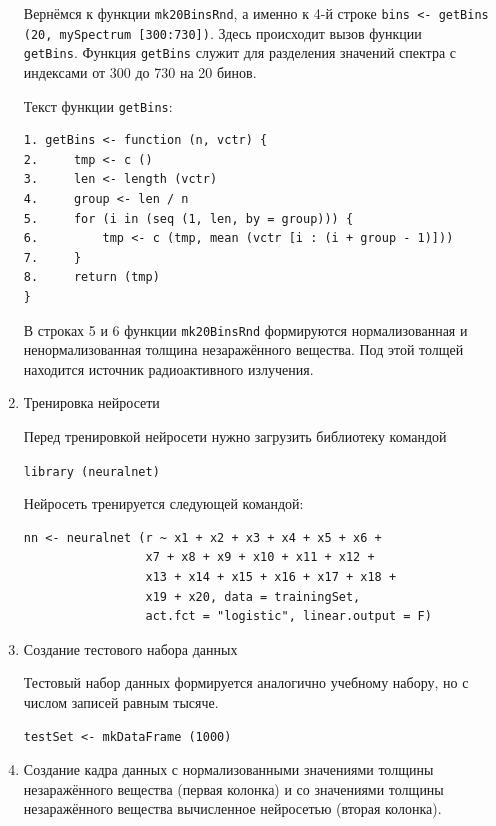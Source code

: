 \documentclass[12pt]{article}
\begin{document}
\begin{enumerate}
  Вернёмся к функции \verb|mk20BinsRnd|, а именно к 4-й строке \newline \verb|bins <- getBins (20, mySpectrum [300:730])|. Здесь происходит вызов функции \\ \verb|getBins|. Функция \verb|getBins| служит для разделения значений спектра с индексами от 300 до 730 на 20 бинов.

  Текст функции \verb|getBins|:

\begin{verbatim}
1. getBins <- function (n, vctr) {
2.     tmp <- c ()
3.     len <- length (vctr)
4.     group <- len / n
5.     for (i in (seq (1, len, by = group))) {
6.         tmp <- c (tmp, mean (vctr [i : (i + group - 1)]))
7.     }
8.     return (tmp)
}
\end{verbatim}

  В строках 5 и 6 функции \verb|mk20BinsRnd| формируются нормализованная и ненормализованная толщина незаражённого вещества. Под этой толщей находится источник радиоактивного излучения.

\item{Тренировка нейросети}

  Перед тренировкой нейросети нужно загрузить библиотеку командой

  \verb|library (neuralnet)|

  Нейросеть тренируется следующей командой:

\begin{verbatim}
nn <- neuralnet (r ~ x1 + x2 + x3 + x4 + x5 + x6 + 
                 x7 + x8 + x9 + x10 + x11 + x12 + 
                 x13 + x14 + x15 + x16 + x17 + x18 + 
                 x19 + x20, data = trainingSet, 
                 act.fct = "logistic", linear.output = F)
\end{verbatim}

\item{Создание тестового набора данных}

  Тестовый набор данных формируется аналогично учебному набору, но с числом записей равным тысяче.

\begin{verbatim}
testSet <- mkDataFrame (1000)
\end{verbatim}

\item{Создание кадра данных с нормализованными значениями толщины незаражённого вещества (первая колонка) и со значениями толщины незаражённого вещества вычисленное нейросетью (вторая колонка).}


\end{enumerate}
\end{document}
